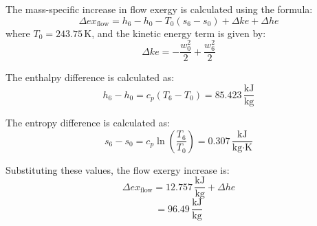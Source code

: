 The mass-specific increase in flow exergy is calculated using the formula:  
\[
\Delta ex_{\text{flow}} = h_6 - h_0 - T_0 (s_6 - s_0) + \Delta ke + \Delta he
\]  
where \( T_0 = 243.75 \, \text{K} \), and the kinetic energy term is given by:  
\[
\Delta ke = -\frac{w_0^2}{2} + \frac{w_6^2}{2}
\]  

The enthalpy difference is calculated as:  
\[
h_6 - h_0 = c_p (T_6 - T_0) = 85.423 \, \frac{\text{kJ}}{\text{kg}}
\]  

The entropy difference is calculated as:  
\[
s_6 - s_0 = c_p \ln \left( \frac{T_6}{T_0} \right) = 0.307 \, \frac{\text{kJ}}{\text{kg·K}}
\]  

Substituting these values, the flow exergy increase is:  
\[
\Delta ex_{\text{flow}} = 12.757 \, \frac{\text{kJ}}{\text{kg}} + \Delta he
\]  
\[
= 96.49 \, \frac{\text{kJ}}{\text{kg}}
\]